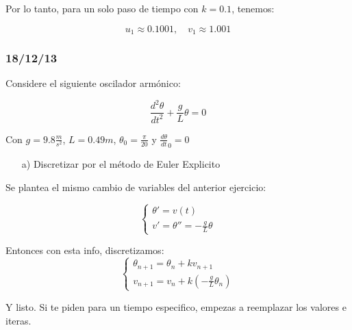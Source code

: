 Por lo tanto, para un solo paso de tiempo con \( k = 0.1 \), tenemos:

\[
u_1 \approx 0.1001, \quad v_1 \approx 1.001
\]
\subsubsection{18/12/13}

Considere el siguiente oscilador armónico: 

$$
    \frac{d^2\theta}{dt^2} + \frac{g}{L}\theta = 0
$$

Con $g=9.8 \frac{m}{s^2}$, $L = 0.49m$, $\theta_0 = \frac{\pi}{20}$ y $\frac{d\theta}{dt}_0 = 0$


\begin{enumerate}
    \item[a)] Discretizar por el método de Euler Explicito 
\end{enumerate}



Se plantea el mismo cambio de variables del anterior ejercicio: 

\begin{equation}
\left\{
\begin{array}{l}
\theta' = v(t) \\
v' = \theta'' = -\frac{g}{L}\theta
\end{array}
\right.
\end{equation}


Entonces con esta info, discretizamos: 
\begin{equation}
\left\{
\begin{array}{l}
\theta_{n+1} = \theta_n + k v_{n+1} \\
v_{n+1} = v_n + k (-\frac{g}{L}\theta_n)
\end{array}
\right.
\end{equation}

Y listo. Si te piden para un tiempo especifico, empezas a reemplazar los valores e iteras.



